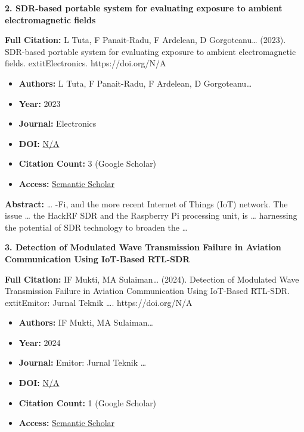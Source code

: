 \documentclass[11pt,a4paper]{article}
\begin{document}
\textbf{2. SDR-based portable system for evaluating exposure to ambient electromagnetic fields}

\textbf{Full Citation:} L Tuta, F Panait-Radu, F Ardelean, D Gorgoteanu… (2023). SDR-based portable system for evaluating exposure to ambient electromagnetic fields. 	extit{Electronics}. https://doi.org/N/A

\begin{resultbox}
\begin{itemize}[leftmargin=*]
    \item \textbf{Authors:} L Tuta, F Panait-Radu, F Ardelean, D Gorgoteanu…
    \item \textbf{Year:} 2023
    \item \textbf{Journal:} Electronics
    
    
    
    \item \textbf{DOI:} \href{https://doi.org/}{N/A}
    \item \textbf{Citation Count:} 3 (Google Scholar)
    \item \textbf{Access:} \href{https://www.mdpi.com/2079-9292/12/24/5003}{Semantic Scholar}
\end{itemize}
\end{resultbox}

\textbf{Abstract:} … -Fi, and the more recent Internet of Things (IoT) network. The issue … the HackRF SDR and the Raspberry Pi processing unit, is … harnessing the potential of SDR technology to broaden the …\par\vspace{0.5em}



\textbf{3. Detection of Modulated Wave Transmission Failure in Aviation Communication Using IoT-Based RTL-SDR}

\textbf{Full Citation:} IF Mukti, MA Sulaiman… (2024). Detection of Modulated Wave Transmission Failure in Aviation Communication Using IoT-Based RTL-SDR. 	extit{Emitor: Jurnal Teknik …}. https://doi.org/N/A

\begin{resultbox}
\begin{itemize}[leftmargin=*]
    \item \textbf{Authors:} IF Mukti, MA Sulaiman…
    \item \textbf{Year:} 2024
    \item \textbf{Journal:} Emitor: Jurnal Teknik …
    
    
    
    \item \textbf{DOI:} \href{https://doi.org/}{N/A}
    \item \textbf{Citation Count:} 1 (Google Scholar)
    \item \textbf{Access:} \href{https://journals2.ums.ac.id/emitor/article/view/6223}{Semantic Scholar}
\end{itemize}
\end{resultbox}
\end{document}
